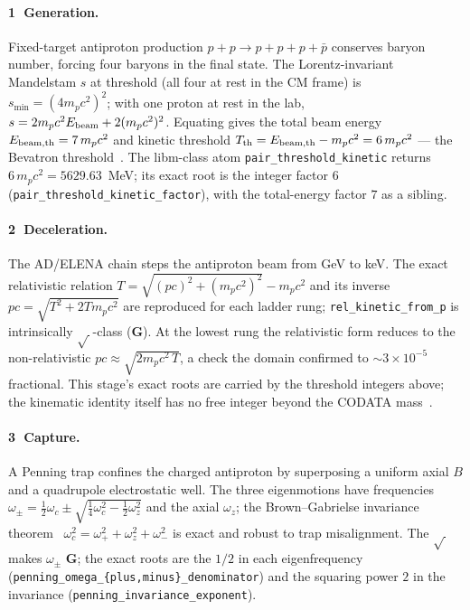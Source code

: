 \documentclass[11pt,a4paper]{article}
\newcommand{\tierGreen}{\textbf{G}}
\newcommand{\stg}[1]{\textcircled{\scriptsize#1}}
\begin{document}
\paragraph{\stg{1} Generation.} Fixed-target antiproton production
$p+p\to p+p+p+\bar p$ conserves baryon number, forcing four baryons in the
final state. The Lorentz-invariant Mandelstam $s$ at threshold (all four at
rest in the CM frame) is $s_{\min}=(4m_pc^2)^2$; with one proton at rest in
the lab, $s=2m_pc^2 E_{\rm beam}+2(m_pc^2)^2$. Equating gives the total
beam energy $E_{\rm beam,th}=7\,m_pc^2$ and kinetic threshold
$T_{\rm th}=E_{\rm beam,th}-m_pc^2=6\,m_pc^2$ --- the Bevatron
threshold~\citep{Chamberlain1955}. The libm-class atom
\texttt{pair\_threshold\_kinetic} returns $6\,m_pc^2=5629.63$~MeV; its exact
root is the integer factor $6$ (\texttt{pair\_threshold\_kinetic\_factor}),
with the total-energy factor $7$ as a sibling.

\paragraph{\stg{2} Deceleration.} The AD/ELENA chain steps the antiproton
beam from GeV to keV. The exact relativistic relation
$T=\sqrt{(pc)^2+(m_pc^2)^2}-m_pc^2$ and its inverse
$pc=\sqrt{T^2+2Tm_pc^2}$ are reproduced for each ladder rung;
\texttt{rel\_kinetic\_from\_p} is intrinsically $\sqrt{\,}$-class
(\tierGreen). At the lowest rung the relativistic form reduces to the
non-relativistic $pc\approx\sqrt{2m_pc^2\,T}$, a check the domain confirmed
to $\sim\!3\times10^{-5}$ fractional. This stage's exact roots are carried
by the threshold integers above; the kinematic identity itself has no
free integer beyond the CODATA mass~\citep{Tiesinga2021}.

\paragraph{\stg{3} Capture.} A Penning trap confines the charged antiproton
by superposing a uniform axial $B$ and a quadrupole electrostatic well. The
three eigenmotions have frequencies
$\omega_\pm=\tfrac12\omega_c\pm\sqrt{\tfrac14\omega_c^2-\tfrac12\omega_z^2}$
and the axial $\omega_z$; the Brown--Gabrielse invariance
theorem~\citep{Brown1986}
$\omega_c^2=\omega_+^2+\omega_z^2+\omega_-^2$ is exact and robust to trap
misalignment. The $\sqrt{\,}$ makes $\omega_\pm$ \tierGreen; the exact roots
are the $1/2$ in each eigenfrequency
(\texttt{penning\_omega\_\{plus,minus\}\_denominator}) and the squaring
power $2$ in the invariance (\texttt{penning\_invariance\_exponent}).
\end{document}
